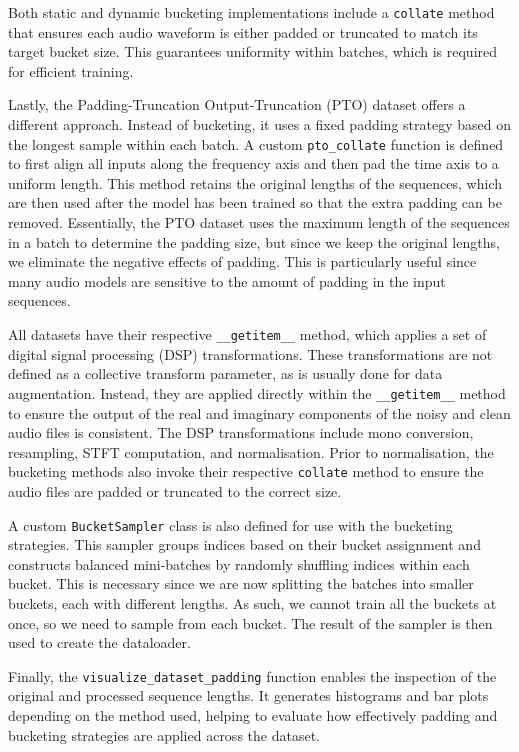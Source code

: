Both static and dynamic bucketing implementations include a \texttt{collate} method that ensures each audio waveform is either padded or truncated to match its target bucket size. This guarantees uniformity within batches, which is required for efficient training.

Lastly, the Padding-Truncation Output-Truncation (PTO) dataset offers a different approach. Instead of bucketing, it uses a fixed padding strategy based on the longest sample within each batch. A custom \texttt{pto\_collate} function is defined to first align all inputs along the frequency axis and then pad the time axis to a uniform length. This method retains the original lengths of the sequences, which are then used after the model has been trained so that the extra padding can be removed. Essentially, the PTO dataset uses the maximum length of the sequences in a batch to determine the padding size, but since we keep the original lengths, we eliminate the negative effects of padding. This is particularly useful since many audio models are sensitive to the amount of padding in the input sequences.

All datasets have their respective \texttt{\_\_getitem\_\_} method, which applies a set of digital signal processing (DSP) transformations. These transformations are not defined as a collective transform parameter, as is usually done for data augmentation. Instead, they are applied directly within the \texttt{\_\_getitem\_\_} method to ensure the output of the real and imaginary components of the noisy and clean audio files is consistent. The DSP transformations include mono conversion, resampling, STFT computation, and normalisation. Prior to normalisation, the bucketing methods also invoke their respective \texttt{collate} method to ensure the audio files are padded or truncated to the correct size.

A custom \texttt{BucketSampler} class is also defined for use with the bucketing strategies. This sampler groups indices based on their bucket assignment and constructs balanced mini-batches by randomly shuffling indices within each bucket. This is necessary since we are now splitting the batches into smaller buckets, each with different lengths. As such, we cannot train all the buckets at once, so we need to sample from each bucket. The result of the sampler is then used to create the dataloader.

Finally, the \texttt{visualize\_dataset\_padding} function enables the inspection of the original and processed sequence lengths. It generates histograms and bar plots depending on the method used, helping to evaluate how effectively padding and bucketing strategies are applied across the dataset.

